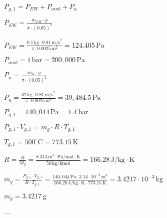 \( P_{g,1} = P_{EW} + P_{amb} + P_{u} \)  

\( P_{EW} = \frac{m_{EW} \cdot g}{\pi \cdot (0.05)^2} \)  

\( P_{EW} = \frac{0.1 \, \text{kg} \cdot 9.81 \, \text{m/s}^2}{\pi \cdot 0.0025 \, \text{m}^2} = 124.405 \, \text{Pa} \)  

\( P_{amb} = 1 \, \text{bar} = 200,000 \, \text{Pa} \)  

\( P_{u} = \frac{m_K \cdot g}{\pi \cdot (0.05)^2} \)  

\( P_{u} = \frac{32 \, \text{kg} \cdot 9.81 \, \text{m/s}^2}{\pi \cdot 0.0025 \, \text{m}^2} = 39,484.5 \, \text{Pa} \)  

\( P_{g,1} = 140,044 \, \text{Pa} = 1.4 \, \text{bar} \)  

\( P_{g,1} \cdot V_{g,1} = m_g \cdot R \cdot T_{g,1} \)  

\( T_{g,1} = 500^\circ \text{C} = 773.15 \, \text{K} \)  

\( R = \frac{\bar{R}}{M_g} = \frac{8.314 \, \text{m}^3 \cdot \text{Pa}/\text{mol} \cdot \text{K}}{50 \, \text{kg}/\text{kmol}} = 166.28 \, \text{J}/\text{kg} \cdot \text{K} \)  

\( m_g = \frac{P_{g,1} \cdot V_{g,1}}{R \cdot T_{g,1}} = \frac{140,044 \, \text{Pa} \cdot 3.14 \cdot 10^{-3} \, \text{m}^3}{166.28 \, \text{J}/\text{kg} \cdot \text{K} \cdot 773.15 \, \text{K}} = 3.4217 \cdot 10^{-3} \, \text{kg} \)  

\( m_g = 3.4217 \, \text{g} \)  

---